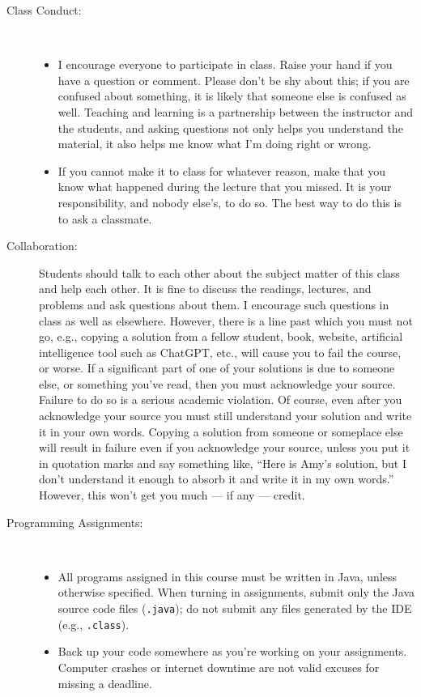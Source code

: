 \documentclass [letterpaper,11pt]{article}
\begin{document}
\begin{description}
\item[Class Conduct:] \
   \begin{itemize}\setlength{\itemsep}{0em}\setlength{\parskip}{0pt}
        \item I encourage everyone to participate in class.  Raise your hand if you have a question
        or comment. Please don't be shy about this; if you are confused about
        something, it is likely that someone else is confused as well.
                Teaching and learning is a partnership between the instructor and the students, and asking questions not only helps you understand the material, it also
                helps me know what I'm doing right or wrong.

        \item  If you cannot make it to class for whatever reason, make that you know
        what happened during the lecture that you missed.  It is your responsibility, and nobody else's,
        to do so.  The best way to do this is to ask a classmate.            
     \end{itemize}
     
\item[Collaboration:]
Students should talk to each other about the subject matter of this class and help each other.  It is fine to discuss the readings, lectures, and problems and ask questions about them. I encourage such questions in class as well as elsewhere. However, there is a line past which you must not go, e.g., copying a solution from a fellow student, book, website, artificial intelligence tool such as ChatGPT, etc., will cause you to fail the course, or worse. If a significant part of one of your solutions is due to someone else, or something you've read, then you must acknowledge your source. Failure to do so is a serious academic violation. Of course, even after you acknowledge your source you must still understand your solution and write it in your own words. Copying a solution from someone or someplace else will result in failure even if you acknowledge your source, unless you put it in quotation marks and say something like, ``Here is Amy's solution, but I don't understand it enough to absorb it and write it in my own words.'' However, this won't get you much --- if any --- credit. 



\item[Programming Assignments:]\

\begin{itemize}\setlength{\itemsep}{0em}\setlength{\parskip}{0pt}
	\item All programs assigned in this course must be written in Java, unless otherwise specified.  When turning in assignments,
	submit only the Java source code files (\texttt{.java}); do not submit any files generated by the IDE (e.g., \texttt{.class}).	
			\item Back up your code somewhere as you're working on your assignments.  Computer
		crashes or internet downtime are not valid excuses for missing a deadline.
				


\end{itemize}
\end{description}
\end{document}
